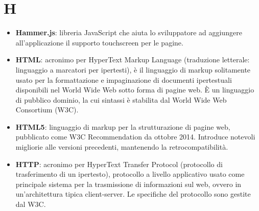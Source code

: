 \section{H}
\begin{itemize} 
	\item \textbf{Hammer.js}: libreria JavaScript che aiuta lo sviluppatore ad aggiungere all'applicazione il supporto touchscreen per le pagine.
	\item \textbf{HTML}: acronimo per HyperText Markup Language (traduzione letterale: linguaggio a marcatori per ipertesti), è il linguaggio di markup solitamente usato per la formattazione e impaginazione di documenti ipertestuali disponibili nel World Wide Web sotto forma di pagine web. È un linguaggio di pubblico dominio, la cui sintassi è stabilita dal World Wide Web Consortium (W3C). 
	\item \textbf{HTML5}: linguaggio di markup per la strutturazione di pagine web, pubblicato come W3C Recommendation da ottobre 2014. Introduce notevoli migliorie alle versioni precedenti, mantenendo la retrocompatibilità.
	\item \textbf{HTTP}: acronimo per HyperText Transfer Protocol (protocollo di trasferimento di un ipertesto), protocollo a livello applicativo usato come principale sistema per la trasmissione di informazioni sul web, ovvero in un'architettura tipica client-server. Le specifiche del protocollo sono gestite dal W3C.
\end{itemize}
